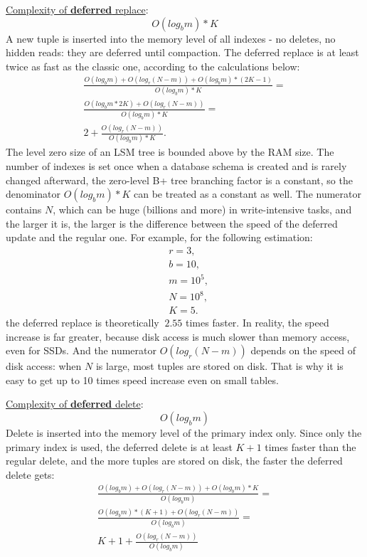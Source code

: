 \documentclass{vldb}
\begin{document}
\underline{Complexity of \textbf{deferred} replace}:
\begin{displaymath}
O(log_bm) * K
\end{displaymath}
A new tuple is inserted into the memory level of all indexes - no deletes, no
hidden reads: they are deferred until compaction. The deferred replace is at
least twice as fast as the classic one, according to the calculations below:
\begin{gather*}
\frac{O(log_bm) + O(log_r(N - m)) + O(log_bm) * (2K - 1)}{O(log_bm) * K} = \\
\frac{O(log_bm * 2K) + O(log_r(N - m))}{O(log_bm) * K} = \\
2 + \frac{O(log_r(N - m))}{O(log_bm) * K}.
\end{gather*}
The level zero size of an LSM tree is bounded above by the RAM size. The
number of indexes is set once when a database schema is created and is
rarely changed afterward, the zero-level B+ tree branching factor is a constant,
so the denominator $O(log_bm) * K$ can be treated as a constant as well.
The numerator contains $N$, which can be huge (billions and more) in
write-intensive tasks, and the larger it is, the larger is the difference between
the speed of the deferred update and the regular one. For example, for the
following estimation:
\begin{align*}
&r = 3, \\
&b = 10, \\
&m = 10^5, \\
&N = 10^8, \\
&K = 5.
\end{align*}
the deferred replace is theoretically $~2.55$ times faster. In reality, the
speed increase is far greater, because disk access is much slower
than memory access, even for SSDs. And the numerator $O(log_r(N - m))$
depends on the speed of disk access: when $N$ is large, most tuples are stored on
disk. That is why it is easy to get up to 10 times speed increase even on small
tables.

\underline{Complexity of \textbf{deferred} delete}:
\begin{displaymath}
O(log_bm)
\end{displaymath}
Delete is inserted into the memory level of the primary index only. Since only the primary
index is used, the deferred delete is at least $K + 1$ times faster than the regular delete,
and the more tuples are stored on disk, the faster the deferred delete gets:
\begin{gather*}
\frac{O(log_bm) + O(log_r(N-m)) + O(log_bm) * K}{O(log_bm)} = \\
\frac{O(log_bm)*(K + 1) + O(log_r(N-m))}{O(log_bm)} = \\
K + 1 + \frac{O(log_r(N-m))}{O(log_bm)}
\end{gather*}
\end{document}

